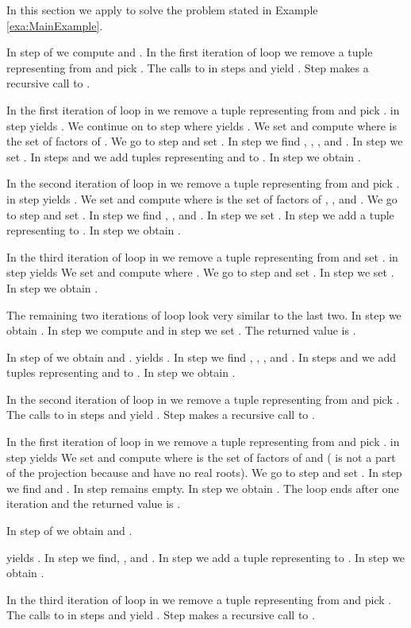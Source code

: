 \documentclass[english]{amsart}
\numberwithin{equation}{section}
\numberwithin{figure}{section}
\begin{document}
In this section we apply  to solve the problem stated in Example
\ref{exa:MainExample}.

In step  of  we compute 
and . In the first
iteration of loop  we remove a tuple representing 
from  and pick . The calls to  in steps
 and  yield . Step  makes a recursive
call to .

In the first iteration of loop  in  we remove
a tuple representing  from  and pick .
 in step  yields .
We continue on to step  where  yields
. We set  and compute 
where  is the set of factors of .
We go to step  and set .
In step  we find ,
, , and .
In step  we set . In steps 
and  we add tuples representing  and 
to . In step  we obtain .

In the second iteration of loop  in  we remove
a tuple representing  from  and pick .
 in step  yields .
We set  and compute 
where  is the set of factors of ,
, and .
We go to step  and set .
In step  we find , ,
and . In step  we set .
In step  we add a tuple representing  to . In
step  we obtain .

In the third iteration of loop  in  we remove
a tuple representing  from  and set . 
in step  yields 
We set  and compute 
where . We go to step  and set .
In step  we set . In step 
we obtain .

The remaining two iterations of loop  look very similar to the
last two. In step  we obtain .
In step  we compute 
 and in step  we set . The
returned value is .

In step  of  we obtain 
and . 
 yields . In step  we find ,
, , and . In steps
 and  we add tuples representing  and
 to . In step  we obtain .

In the second iteration of loop  in  we remove
a tuple representing  from  and pick .
The calls to  in steps  and  yield .
Step  makes a recursive call to .

In the first iteration of loop  in  we remove
a tuple representing  from  and pick .
 in step  yields 
We set  and compute 
where  is the set of factors of 
and  ( is not a part of the
projection because  and  have no real
roots). We go to step  and set .
In step  we find  and .
In step   remains empty. In step  we obtain .
The loop ends after one iteration and the returned value is .

In step  of  we obtain  and .

yields . In step  we find,
, and . In step  we add
a tuple representing  to . In step  we obtain
.

In the third iteration of loop  in  we remove
a tuple representing  from  and pick . The
calls to  in steps  and  yield .
Step  makes a recursive call to .
\end{document}
